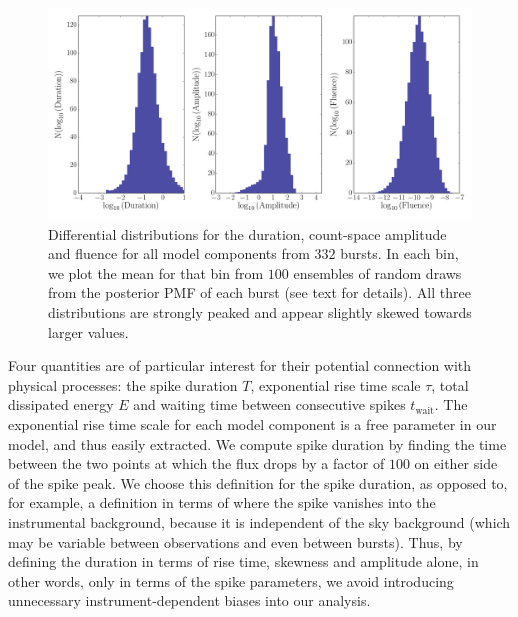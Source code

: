 \documentclass[12pt]{emulateapj}
\begin{document}
\begin{figure}[htbp]
\begin{center}
\includegraphics[width=\textwidth]{sgr1550_diff_dist.pdf}
\caption{Differential distributions for the duration, count-space amplitude and fluence for all model components from $332$ bursts. In each bin, we plot the mean for
that bin from $100$ ensembles of random draws from the posterior PMF of each burst (see text for details). All three distributions are strongly peaked and appear slightly 
skewed towards larger values. }
\label{fig:diffdist}
\end{center}
\end{figure}

Four quantities are of particular interest for their potential connection with physical processes: the spike duration $T$, exponential rise time scale $\tau$,
total dissipated energy $E$ and waiting time between consecutive spikes $t_\mathrm{wait}$. The exponential rise time scale for each model component is a free parameter
in our model, and thus easily extracted. We compute spike duration by finding the time between the two points at which the flux drops by a
 factor of $100$ on either side of the spike peak. We choose this definition for the spike duration, as opposed to, for example, a definition in terms of where the spike vanishes
 into the instrumental background, because it is independent of the sky background (which may be variable between observations and even between bursts). Thus, by defining the 
 duration in terms of rise time, skewness and amplitude alone, in other words, only in terms of the spike parameters, we avoid introducing unnecessary instrument-dependent
 biases into our analysis.
 
\end{document}
